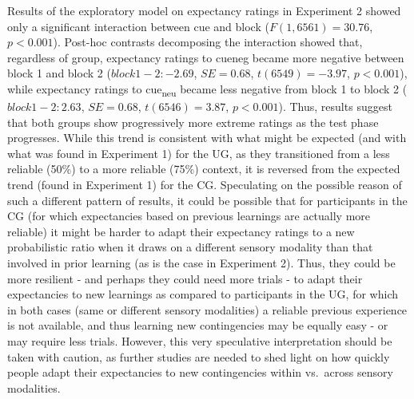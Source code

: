 \documentclass[
]{article}
\begin{document}
Results of the exploratory model on expectancy ratings in Experiment 2 showed only a significant interaction between cue and block (\(F(1, 6561) = 30.76\), \(p < 0.001\)). Post-hoc contrasts decomposing the interaction showed that, regardless of group, expectancy ratings to cueneg became more negative between block 1 and block 2 (\(block 1-2: -2.69\), \(SE = 0.68\), \(t(6549) = -3.97\), \(p < 0.001\)), while expectancy ratings to cue\textsubscript{neu} became less negative from block 1 to block 2 (\(block 1-2: 2.63\), \(SE = 0.68\), \(t(6546) = 3.87\), \(p < 0.001\)).
Thus, results suggest that both groups show progressively more extreme ratings as the test phase progresses. While this trend is consistent with what might be expected (and with what was found in Experiment 1) for the UG, as they transitioned from a less reliable (50\%) to a more reliable (75\%) context, it is reversed from the expected trend (found in Experiment 1) for the CG. Speculating on the possible reason of such a different pattern of results, it could be possible that for participants in the CG (for which expectancies based on previous learnings are actually more reliable) it might be harder to adapt their expectancy ratings to a new probabilistic ratio when it draws on a different sensory modality than that involved in prior learning (as is the case in Experiment 2). Thus, they could be more resilient - and perhaps they could need more trials - to adapt their expectancies to new learnings as compared to participants in the UG, for which in both cases (same or different sensory modalities) a reliable previous experience is not available, and thus learning new contingencies may be equally easy - or may require less trials. However, this very speculative interpretation should be taken with caution, as further studies are needed to shed light on how quickly people adapt their expectancies to new contingencies within vs.~across sensory modalities.
\end{document}
